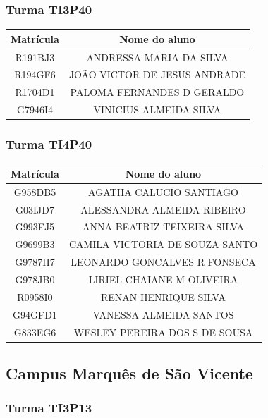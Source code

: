 \documentclass[
]{book}
\begin{document}
\subsubsection{Turma TI3P40}\label{turma-ti3p40}

\begin{longtable}[]{@{}cc@{}}
\toprule\noalign{}
Matrícula & Nome do aluno \\
\midrule\noalign{}
\endhead
\bottomrule\noalign{}
\endlastfoot
R191BJ3 & ANDRESSA MARIA DA SILVA \\
R194GF6 & JOÃO VICTOR DE JESUS ANDRADE \\
R1704D1 & PALOMA FERNANDES D GERALDO \\
G7946I4 & VINICIUS ALMEIDA SILVA \\
\end{longtable}

\subsubsection{Turma TI4P40}\label{turma-ti4p40}

\begin{longtable}[]{@{}cc@{}}
\toprule\noalign{}
Matrícula & Nome do aluno \\
\midrule\noalign{}
\endhead
\bottomrule\noalign{}
\endlastfoot
G958DB5 & AGATHA CALUCIO SANTIAGO \\
G03IJD7 & ALESSANDRA ALMEIDA RIBEIRO \\
G993FJ5 & ANNA BEATRIZ TEIXEIRA SILVA \\
G9699B3 & CAMILA VICTORIA DE SOUZA SANTO \\
G9787H7 & LEONARDO GONCALVES R FONSECA \\
G978JB0 & LIRIEL CHAIANE M OLIVEIRA \\
R0958I0 & RENAN HENRIQUE SILVA \\
G94GFD1 & VANESSA ALMEIDA SANTOS \\
G833EG6 & WESLEY PEREIRA DOS S DE SOUSA \\
\end{longtable}

\subsection{Campus Marquês de São Vicente}\label{campus-marquuxeas-de-suxe3o-vicente}

\subsubsection{Turma TI3P13}\label{turma-ti3p13}
\end{document}
